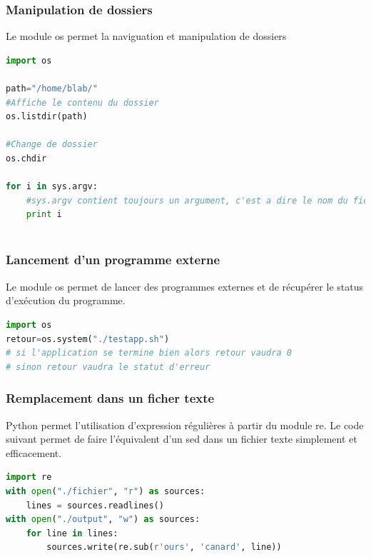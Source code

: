 \documentclass[]{beamer}
\begin{document}
\begin{frame}[fragile]
\frametitle{Manipulation de dossiers }
Le module os permet la naviguation et manipulation de dossiers
\begin{lstlisting}[language=Python]
import os

path="/home/blab/"
#Affiche le contenu du dossier
os.listdir(path)

#Change de dossier
os.chdir

for i in sys.argv:
	#sys.argv contient toujours un argument, c'est a dire le nom du fichier python
	print i



\end{lstlisting}
\end{frame}

\begin{frame}[fragile]
\frametitle{Lancement d'un programme externe}
Le module os permet de lancer des programmes externes et de récupérer le status d'exécution du programme.
\begin{lstlisting}[language=Python]
import os
retour=os.system("./testapp.sh")   
# si l'application se termine bien alors retour vaudra 0
# sinon retour vaudra le statut d'erreur 
\end{lstlisting}

\end{frame}

\begin{frame}[fragile]
\frametitle{Remplacement dans un ficher texte}
Python permet l'utilisation d'expression régulières à partir du module re. Le code suivant permet de faire l'équivalent d'un sed dans un fichier texte simplement et efficacement.
\begin{lstlisting}[language=Python]
import re
with open("./fichier", "r") as sources:
    lines = sources.readlines()
with open("./output", "w") as sources:
    for line in lines:
        sources.write(re.sub(r'ours', 'canard', line))
        
\end{lstlisting}
\end{frame}


 
\end{document}
